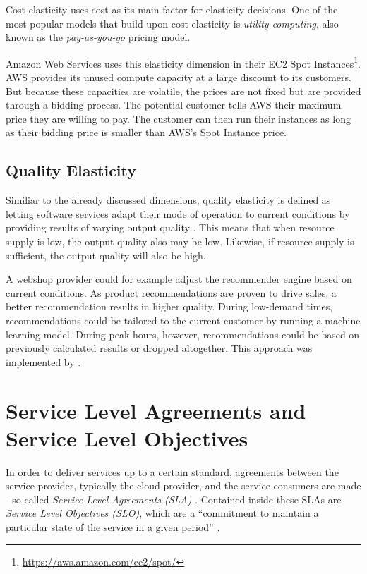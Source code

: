 Cost elasticity uses cost as its main factor for elasticity decisions. One of the most popular models that build upon cost elasticity is \textit{utility computing}, also known as the \textit{pay-as-you-go} pricing model.

Amazon Web Services uses this elasticity dimension in their EC2 Spot Instances\footnote{\url{https://aws.amazon.com/ec2/spot/}}. AWS provides its unused compute capacity at a large discount to its customers. But because these capacities are volatile, the prices are not fixed but are provided through a bidding process. The potential customer tells AWS their maximum price they are willing to pay. The customer can then run their instances as long as their bidding price is smaller than AWS's Spot Instance price.

\subsection{Quality Elasticity}

Similiar to the already discussed dimensions, quality elasticity is defined as letting software services adapt their mode of operation to current conditions by providing results of varying output quality \cite{larssonQualityElasticityImprovedResource2019}. This means that when resource supply is low, the output quality also may be low. Likewise, if resource supply is sufficient, the output quality will also be high.

A webshop provider could for example adjust the recommender engine based on current conditions. As product recommendations are proven to drive sales, a better recommendation results in higher quality. During low-demand times, recommendations could be tailored to the current customer by running a machine learning model. During peak hours, however, recommendations could be based on previously calculated results or dropped altogether. This approach was implemented by \citeauthor{larssonQualityElasticityImprovedResource2019} \cite{larssonQualityElasticityImprovedResource2019}.

\section{Service Level Agreements and Service Level Objectives}

In order to deliver services up to a certain standard, agreements between the service provider, typically the cloud provider, and the service consumers are made - so called \textit{Service Level Agreements (SLA)} \cite{emeakarohaLowLevelMetrics2010d}. Contained inside these SLAs are \textit{Service Level Objectives (SLO)}, which are a ``commitment to maintain a particular state of the service in a given period'' \cite{kellerWSLAFrameworkSpecifying2003}.

